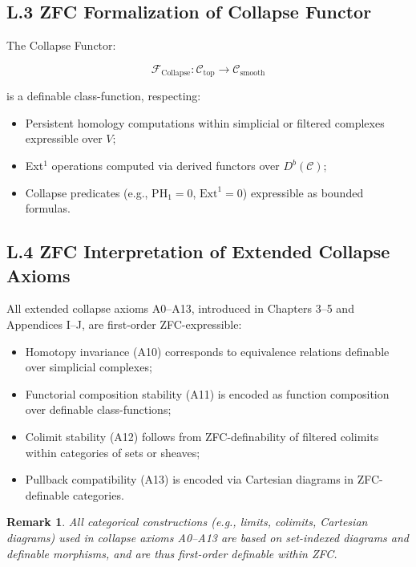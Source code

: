 \documentclass[11pt]{article}
\newtheorem{remark}[theorem]{Remark}
\begin{document}
\subsection*{L.3 ZFC Formalization of Collapse Functor}

The Collapse Functor:

\[
\mathcal{F}_{\mathrm{Collapse}} : \mathcal{C}_{\mathrm{top}} \to \mathcal{C}_{\mathrm{smooth}}
\]

is a definable class-function, respecting:

\begin{itemize}
    \item Persistent homology computations within simplicial or filtered complexes expressible over \( V \);
    \item Ext$^1$ operations computed via derived functors over \( D^b(\mathcal{C}) \);
    \item Collapse predicates (e.g., \( \mathrm{PH}_1 = 0 \), \( \mathrm{Ext}^1 = 0 \)) expressible as bounded formulas.
\end{itemize}

\subsection*{L.4 ZFC Interpretation of Extended Collapse Axioms}

All extended collapse axioms A0–A13, introduced in Chapters 3–5 and Appendices I–J, are first-order ZFC-expressible:

\begin{itemize}
    \item Homotopy invariance (A10) corresponds to equivalence relations definable over simplicial complexes;
    \item Functorial composition stability (A11) is encoded as function composition over definable class-functions;
    \item Colimit stability (A12) follows from ZFC-definability of filtered colimits within categories of sets or sheaves;
    \item Pullback compatibility (A13) is encoded via Cartesian diagrams in ZFC-definable categories.
\end{itemize}

\begin{remark}
All categorical constructions (e.g., limits, colimits, Cartesian diagrams) used in collapse axioms A0–A13  
are based on set-indexed diagrams and definable morphisms, and are thus first-order definable within ZFC.
\end{remark}
\end{document}
